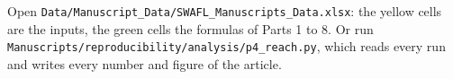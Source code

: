 Open \nolinkurl{Data/Manuscript_Data/SWAFL_Manuscripts_Data.xlsx}: the yellow cells are the inputs, the green cells the formulas of Parts 1 to 8. Or run \nolinkurl{Manuscripts/reproducibility/analysis/p4_reach.py}, which reads every run and writes every number and figure of the article.
